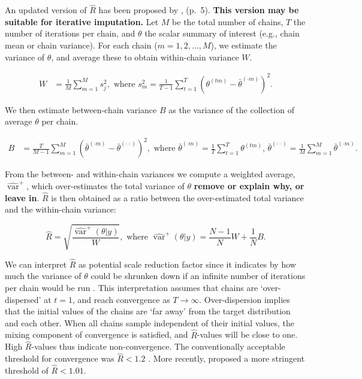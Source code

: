 \documentclass[Royal,times,sageh]{sagej}
\begin{document}
An updated version of \(\widehat{R}\) has been proposed by
\citet{veht19}, (p.~5). \textbf{This version may be suitable for
iterative imputation.} Let \(M\) be the total number of chains, \(T\)
the number of iterations per chain, and \(\theta\) the scalar summary of
interest (e.g., chain mean or chain variance). For each chain
(\(m = 1, 2, \dots, M\)), we estimate the variance of \(\theta\), and
average these to obtain within-chain variance \(W\).

\begin{align*}
W&=\frac{1}{M} \sum_{m=1}^{M} s_{j}^{2}, \text { where } s_{m}^{2}=\frac{1}{T-1} \sum_{t=1}^{T}\left(\theta^{(t m)}-\bar{\theta}^{(\cdot m)}\right)^{2}. 
\end{align*}

We then estimate between-chain variance \(B\) as the variance of the
collection of average \(\theta\) per chain.

\begin{align*}
B&=\frac{T}{M-1} \sum_{m=1}^{M}\left(\bar{\theta}^{(\cdot m)}-\bar{\theta}^{(\cdot \cdot)}\right)^{2}, \text { where } \bar{\theta}^{(\cdot m)}=\frac{1}{T} \sum_{t=1}^{T} \theta^{(t m)} \text{, } \bar{\theta}^{(\cdot \cdot)}=\frac{1}{M} \sum_{m=1}^{M} \bar{\theta}^{(\cdot m)}. 
\end{align*}

From the between- and within-chain variances we compute a weighted
average, \(\widehat{\operatorname{var}}^{+}\), which over-estimates the
total variance of \(\theta\) \textbf{remove or explain why, or leave
in}. \(\widehat{R}\) is then obtained as a ratio between the
over-estimated total variance and the within-chain variance:

\begin{equation*}
\widehat{R}=\sqrt{\frac{\widehat{\operatorname{var}}^{+}(\theta | y)}{W}},
\text{ where } \widehat{\operatorname{var}}^{+}(\theta | y)=\frac{N-1}{N} W+\frac{1}{N} B.
\end{equation*}

We can interpret \(\widehat{R}\) as potential scale reduction factor
since it indicates by how much the variance of \(\theta\) could be
shrunken down if an infinite number of iterations per chain would be run
\citep{gelm92}. This interpretation assumes that chains are
`over-dispersed' at \(t=1\), and reach convergence as \(T \to \infty\).
Over-dispersion implies that the initial values of the chains are `far
away' from the target distribution and each other. When all chains
sample independent of their initial values, the mixing component of
convergence is satisfied, and \(\widehat{R}\)-values will be close to
one. High \(\widehat{R}\)-values thus indicate non-convergence. The
conventionally acceptable threshold for convergence was
\(\widehat{R} < 1.2\) \citep{gelm92}. More recently, \citet{veht19}
proposed a more stringent threshold of \(\widehat{R} < 1.01\).
\end{document}
